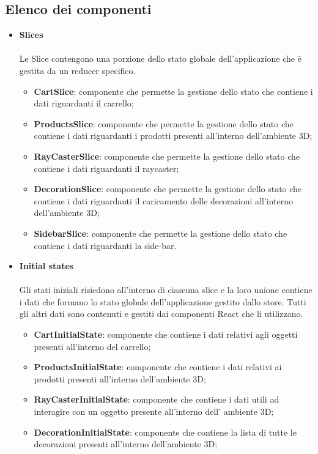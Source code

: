 \subsection{Elenco dei componenti}
\begin{itemize}
	\item \textbf{\large Slices}
	\\\\
	Le Slice contengono una porzione dello stato globale dell'applicazione che è gestita da un reducer specifico.
		\begin{itemize}
			\item \textbf{CartSlice}: componente che permette la gestione dello stato che contiene i dati riguardanti il carrello;
			\item \textbf{ProductsSlice}: componente che permette la gestione dello stato che contiene i dati riguardanti i prodotti 
			presenti all'interno dell'ambiente 3D;
			\item \textbf{RayCasterSlice}: componente che permette la gestione dello stato che contiene i dati riguardanti il
			raycaster;
			\item \textbf{DecorationSlice}: componente che permette la gestione dello stato che contiene i dati riguardanti
			il caricamento delle decorazioni all'interno dell'ambiente 3D;
			\item \textbf{SidebarSlice}: componente che permette la gestione dello stato che contiene i dati riguardanti
			la side-bar.
		\end{itemize}
	\item \textbf{\large Initial states}
	\\\\
	Gli stati iniziali risiedono all'interno di ciascuna slice e la loro unione contiene i dati che formano lo stato globale dell'applicazione gestito dallo store.
	Tutti gli altri dati sono contenuti e gestiti dai componenti React che li utilizzano.
		\begin{itemize}
			\item \textbf{CartInitialState}: componente che contiene i dati relativi agli oggetti presenti all'interno del carrello;
			\item \textbf{ProductsInitialState}: componente che contiene i dati relativi ai prodotti presenti all'interno dell'ambiente 3D;
			\item \textbf{RayCasterInitialState}: componente che contiene i dati utili ad interagire con un oggetto presente all'interno dell'
			ambiente 3D;
			\item \textbf{DecorationInitialState}: componente che contiene la lista di tutte le decorazioni presenti all'interno dell'ambiente 3D;

\end{itemize}
\end{itemize}

